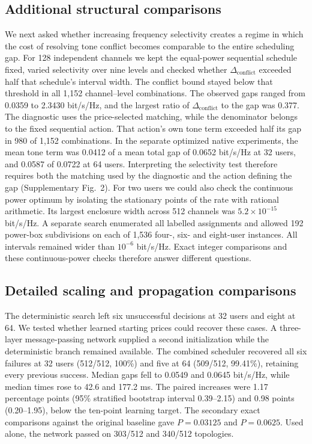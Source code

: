 \documentclass[lineno,pdflatex,sn-nature]{sn-jnl}
\begin{document}
\subsection*{Additional structural comparisons}
We next asked whether increasing frequency selectivity creates a regime in which the cost of resolving tone conflict becomes comparable to the entire scheduling gap. For 128 independent channels we kept the equal-power sequential schedule fixed, varied selectivity over nine levels and checked whether \(\Delta_{\mathrm{conflict}}\) exceeded half that schedule's interval width. The conflict bound stayed below that threshold in all 1,152 channel--level combinations. The observed gaps ranged from 0.0359 to 2.3430 bit/s/Hz, and the largest ratio of \(\Delta_{\mathrm{conflict}}\) to the gap was 0.377. The diagnostic uses the price-selected matching, while the denominator belongs to the fixed sequential action. That action's own tone term exceeded half its gap in 980 of 1,152 combinations. In the separate optimized native experiments, the mean tone term was 0.0412 of a mean total gap of 0.0652 bit/s/Hz at 32 users, and 0.0587 of 0.0722 at 64 users. Interpreting the selectivity test therefore requires both the matching used by the diagnostic and the action defining the gap (Supplementary Fig.~2). For two users we could also check the continuous power optimum by isolating the stationary points of the rate with rational arithmetic. Its largest enclosure width across 512 channels was \(5.2\times10^{-15}\) bit/s/Hz. A separate search enumerated all labelled assignments and allowed 192 power-box subdivisions on each of 1,536 four-, six- and eight-user instances. All intervals remained wider than \(10^{-6}\) bit/s/Hz. Exact integer comparisons and these continuous-power checks therefore answer different questions.

\subsection*{Detailed scaling and propagation comparisons}
The deterministic search left six unsuccessful decisions at 32 users and eight at 64. We tested whether learned starting prices could recover these cases. A three-layer message-passing network supplied a second initialization while the deterministic branch remained available. The combined scheduler recovered all six failures at 32 users (512/512, 100\%) and five at 64 (509/512, 99.41\%), retaining every previous success. Median gaps fell to 0.0549 and 0.0645 bit/s/Hz, while median times rose to 42.6 and 177.2 ms. The paired increases were 1.17 percentage points (95\% stratified bootstrap interval 0.39--2.15) and 0.98 points (0.20--1.95), below the ten-point learning target. The secondary exact comparisons against the original baseline gave \(P=0.03125\) and \(P=0.0625\). Used alone, the network passed on 303/512 and 340/512 topologies.
\end{document}
